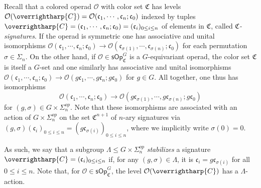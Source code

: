 \documentclass[a4paper,10pt
,draft
]{article}%
\numberwithin{equation}{section}
\numberwithin{figure}{section}
\theoremstyle{definition} %
\newcommand{\vect}[1]{\text{\overrightharp{\ensuremath{#1}}}}
\renewcommand{\O}{\ensuremath{\mathcal O}}
\newcommand{\1}{\ensuremath{\mathbbm 1}}%
\begin{document}
Recall that a colored operad $\O$
with color set $\mathfrak{C}$ has levels 
$
\O(\vect{C})=
\O(\mathfrak{c}_1,\cdots,\mathfrak{c}_n;\mathfrak{c}_0)$
indexed by tuples
$\vect{C} = (\mathfrak{c}_1,\cdots,\mathfrak{c}_n;\mathfrak{c}_0) = (\mathfrak c_i)_{0 \leq i \leq n}$
of elements in $\mathfrak{C}$, called \emph{$\mathfrak{C}$-signatures}.
If the operad is symmetric one has associative and unital isomorphisms
$
\O(\mathfrak{c}_1,\cdots,\mathfrak{c}_n;\mathfrak{c}_0) \to 
\O(\mathfrak{c}_{\sigma(1)},\cdots,\mathfrak{c}_{\sigma(n)};\mathfrak{c}_0)
$
for each permutation $\sigma \in \Sigma_n$.
On the other hand, if 
$\O \in \mathsf{sOp}^G_{\mathfrak{C}}$
is a $G$-equivariant operad, 
the color set $\mathfrak{C}$ is itself a $G$-set
and one similarly has associative and unital isomorphisms
$
\O(\mathfrak{c}_1,\cdots,\mathfrak{c}_n;\mathfrak{c}_0) \to 
\O(g\mathfrak{c}_{1},\cdots,g\mathfrak{c}_{n};g\mathfrak{c}_0)
$ for $g \in G$.
All together, one thus has isomorphisms
\begin{equation}\label{OPSSYMS EQ}
\O(\mathfrak{c}_1,\cdots,\mathfrak{c}_n;\mathfrak{c}_0)
\to 
\O(g \mathfrak{c}_{\sigma(1)},\cdots,g \mathfrak{c}_{\sigma(n)};g\mathfrak{c}_0)
\end{equation}
for $(g,\sigma) \in G \times \Sigma_n^{op}$.
Note that these isomorphisms 
are associated with an action of 
$G \times \Sigma_n^{op}$
on the set $\mathfrak{C}^{n+1}$ of $n$-ary signatures via
$(g,\sigma) (\mathfrak{c}_i)_{0\leq i \leq n}
= (g \mathfrak{c}_{\sigma(i)})_{0\leq i \leq n}$,
where we implicitly write $\sigma(0)=0$.


As such, we say that a subgroup 
$\Lambda \leq G \times \Sigma_n^{op}$
\emph{stabilizes} a signature $\vect{C}=(\mathfrak{c}_i)_{0 \leq i \leq n}$ if,
for any $(g,\sigma) \in \Lambda$,
it is 
$\mathfrak{c}_i = g \mathfrak{c}_{\sigma(i)}$ for all $0 \leq i \leq n$.
Note that,
for $\O \in \mathsf{sOp}^G_{\mathfrak{C}}$,
the level $\O(\vect{C})$ has a $\Lambda$-action.
\end{document}
